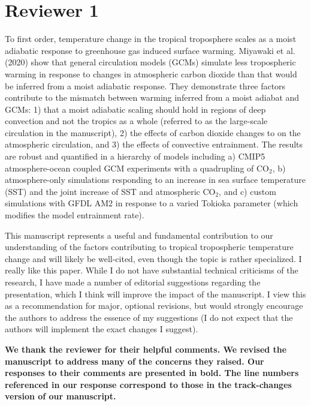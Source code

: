 \documentclass[11pt]{article}
\date{}
\title{}
\begin{document}
\section*{Reviewer 1}
\label{sec:orgec8a955}
To first order, temperature change in the tropical troposphere scales as a moist adiabatic response to greenhouse gas induced surface warming. Miyawaki et al. (2020) show that general circulation models (GCMs) simulate less tropospheric warming in response to changes in atmospheric carbon dioxide than that would be inferred from a moist adiabatic response. They demonstrate three factors contribute to the mismatch between warming inferred from a moist adiabat and GCMs: 1) that a moist adiabatic scaling should hold in regions of deep convection and not the tropics as a whole (referred to as the large-scale circulation in the manuscript), 2) the effects of carbon dioxide changes to on the atmospheric circulation, and 3) the effects of convective entrainment. The results are robust and quantified in a hierarchy of models including a) CMIP5 atmosphere-ocean coupled GCM experiments with a quadrupling of CO\(_2\), b) atmosphere-only simulations responding to an increase in sea surface temperature (SST) and the joint increase of SST and atmospheric CO\(_2\), and c) custom simulations with GFDL AM2 in response to a varied Tokioka parameter (which modifies the model entrainment rate).

This manuscript represents a useful and fundamental contribution to our understanding of the factors contributing to tropical tropospheric temperature change and will likely be well-cited, even though the topic is rather specialized. I really like this paper. While I do not have substantial technical criticisms of the research, I have made a number of editorial suggestions regarding the presentation, which I think will improve the impact of the manuscript. I view this as a recommendation for major, optional revisions, but would strongly encourage the authors to address the essence of my suggestions (I do not expect that the authors will implement the exact changes I suggest).

\textbf{We thank the reviewer for their helpful comments. We revised the manuscript to address many of the concerns they raised. Our responses to their comments are presented in bold. The line numbers referenced in our response correspond to those in the track-changes version of our manuscript.}
\end{document}
